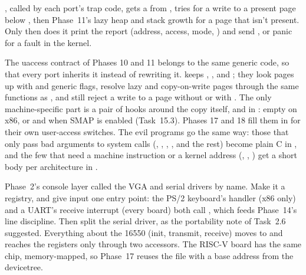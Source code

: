 \documentclass[11pt,a4paper]{article}
\begin{document}
, called by each port's trap code, gets a  from ,
tries  for a write to a present page below , then Phase~11's lazy heap and stack
growth for a page that isn't present. Only then does it print the report (address, access, mode, ) and
send , or panic for a fault in the kernel.

The uaccess contract of Phases 10 and 11 belongs to the same generic code, so that every port inherits it instead of
rewriting it.  keeps , ,
 and ; they look pages up with  and generic
 flags, resolve lazy and copy-on-write pages through the same functions as , and still
reject a write to a page without  or  with . The only machine-specific part
is a pair of hooks around the copy itself,  and  in
: empty on x86, or  and  when SMAP is enabled (Task~15.3). Phases 17 and
18 fill them in for their own user-access switches. The evil programs go the same way: those that only pass bad
arguments to system calls (, , , ,  and the
rest) become plain C in , and the few that need a machine instruction or a kernel address
(, , ) get a short body per architecture in .

Phase~2's console layer called the VGA and serial drivers by name. Make it a registry, and give input one entry point:
the PS/2 keyboard's handler (x86 only) and a UART's receive interrupt (every board) both call ,
which feeds Phase~14's line discipline. Then split the serial driver, as the portability note of Task~2.6 suggested.
Everything about the 16550 (init, transmit, receive) moves to  and reaches the
registers only through two accessors. The RISC-V  board has the same chip, memory-mapped, so Phase~17 reuses
the file with a base address from the devicetree.
\end{document}
